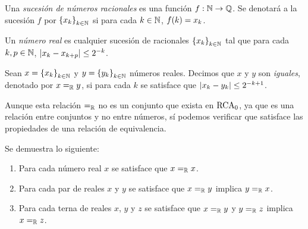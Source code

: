 \begin{definition}[Sucesiones]
	Una \emph{sucesión de números racionales} es una función $f:\NN\to\QQ$. Se denotará a la sucesión $f$ por $\set*{x_{k}}_{k\in\NN}$ si para cada $k\in\NN$, $f\pa*{k} = x_{k}$.
\end{definition}

\begin{definition}
	Un \emph{número real} es cualquier sucesión de racionales $\set*{x_{k}}_{k\in\NN}$ tal que para cada $k, p\in\NN$, $\abs*{x_{k} - x_{k + p}}\leq 2^{-k}$.
\end{definition}

\begin{definition}
	Sean $x =\set*{x_{k}}_{k\in\NN}$ y $y =\set*{y_{k}}_{k\in\NN}$ números reales. Decimos que $x$ y $y$ son \emph{iguales}, denotado por $x =_{\RR} y$, si para cada $k$ se satisface que $\abs*{x_{k} - y_{k}}\leq 2^{-k + 1}$.
\end{definition}

Aunque esta relación $=_{\RR}$ no es un conjunto que exista en $\RCA$, ya que es una relación entre conjuntos y no entre números, sí podemos verificar que satisface las propiedades de una relación de equivalencia.

\begin{theorem}
	Se demuestra lo siguiente:

	\begin{enumerate}
		\item Para cada número real $x$ se satisface que $x =_{\RR} x$.
		\item Para cada par de reales $x$ y $y$ se satisface que $x =_{\RR} y$ implica $y =_{\RR} x$.
		\item Para cada terna de reales $x$, $y$ y $z$ se satisface que $x =_{\RR} y$ y $y =_{\RR} z$ implica $x =_{\RR} z$.
	\end{enumerate}
\end{theorem}

